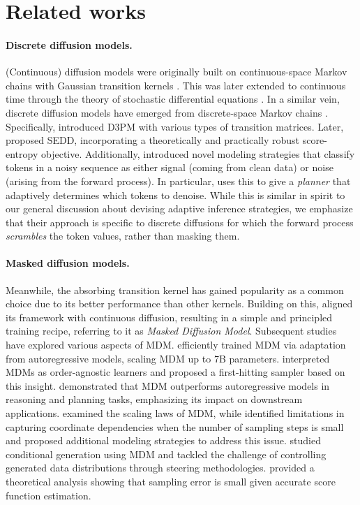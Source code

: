 \section{Related works}
\paragraph{Discrete diffusion models.}
(Continuous) diffusion models were originally built on continuous-space Markov chains with Gaussian transition kernels \cite{sohldickstein2015deep,ho2020denoising}. This was later extended to continuous time through the theory of stochastic differential equations \cite{song2021score}. In a similar vein, discrete diffusion models have emerged from discrete-space Markov chains \cite{hoogeboom2021argmax}. Specifically, \cite{austin2023structured} introduced D3PM with various types of transition matrices. Later, \citet{lou2024discrete} proposed SEDD, incorporating a theoretically and practically robust score-entropy objective. Additionally, \citet{varma2024glauber,liu2024think} introduced novel modeling strategies that classify tokens in a noisy sequence as either signal (coming from clean data) or noise (arising from the forward process). In particular, \citet{liu2024think} uses this to give a \emph{planner} that adaptively determines which tokens to denoise. While this is similar in spirit to our general discussion about devising adaptive inference strategies, we emphasize that their approach is specific to discrete diffusions for which the forward process \emph{scrambles} the token values, rather than masking them.

\paragraph{Masked diffusion models.} Meanwhile, the absorbing transition kernel has gained popularity as a common choice due to its better performance than other kernels. Building on this, \citet{sahoo2024simple,shi2025simplified} aligned its framework with continuous diffusion, resulting in a simple and principled training recipe, referring to it as \emph{Masked Diffusion Model}. Subsequent studies have explored various aspects of MDM. \citet{gong2024scaling} efficiently trained MDM via adaptation from autoregressive models, scaling MDM up to 7B parameters. \citet{zheng2024maskeddiffusionmodelssecretly} interpreted 
MDMs as order-agnostic learners and proposed a first-hitting sampler based on this insight. \citet{ye2024beyond,gong2024scaling} demonstrated that MDM outperforms autoregressive models in reasoning and planning tasks, emphasizing its impact on downstream applications. \citet{nie2024scaling} examined the scaling laws of MDM, while \citet{xu2024energy,liu2024copula} identified limitations in capturing coordinate dependencies when the number of sampling steps is small and proposed additional modeling strategies to address this issue. \citet{schiff2024simple} studied conditional generation using MDM and \citet{rectorbrooks2024steering} tackled the challenge of controlling generated data distributions through steering methodologies. \citet{chen2024convergence} provided a theoretical analysis showing that sampling error is small given accurate score function estimation.


